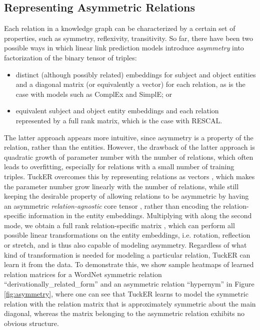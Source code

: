 \documentclass[11pt,a4paper]{article}
\begin{document}
\subsection{Representing Asymmetric Relations}
Each relation in a knowledge graph can be characterized by a certain set of properties, such as symmetry, reflexivity, transitivity. So far, there have been two possible ways in which linear link prediction models introduce \textit{asymmetry} into factorization of the binary tensor of triples:
\vspace{-0.1cm}
\begin{itemize}
    \item distinct (although possibly related) embeddings for subject and object entities and a diagonal matrix (or equivalently a vector) for each relation, as is the case with models such as ComplEx and SimplE; or
    \item equivalent subject and object entity embeddings and each relation represented by a full rank matrix, which is the case with RESCAL.
\end{itemize}
The latter approach appears more intuitive, since asymmetry is a property of the relation, rather than the entities. However, the drawback of the latter approach is quadratic growth of parameter number with the number of relations, which often leads to overfitting, especially for relations with a small number of training triples. TuckER overcomes this by representing relations as vectors , which makes the parameter number grow linearly with the number of relations, while still keeping the desirable property of allowing relations to be asymmetric by having an asymmetric \textit{relation-agnostic} core tensor , rather than encoding the relation-specific information in the entity embeddings. Multiplying  with  along the second mode, we obtain a full rank relation-specific matrix , which can perform all possible linear transformations on the entity embeddings, i.e. rotation, reflection or stretch, and is thus also capable of modeling asymmetry. Regardless of what kind of transformation is needed for modeling a particular relation, TuckER can learn it from the data. To demonstrate this, we show sample heatmaps of learned relation matrices  for a WordNet symmetric relation ``derivationally\_related\_form'' and an asymmetric relation ``hypernym'' in Figure \ref{fig:asymmetry}, where one can see that TuckER learns to model the symmetric relation with the relation matrix that is approximately symmetric about the main diagonal, whereas the matrix belonging to the asymmetric relation exhibits no obvious structure.
\end{document}
